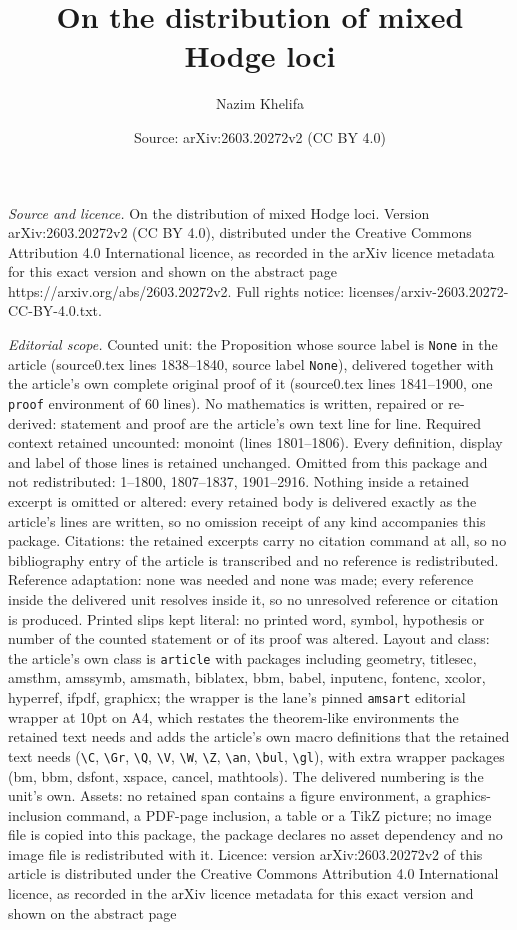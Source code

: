 \documentclass[10pt,a4paper]{amsart}
\title[On the distribution of mixed Hodge loci]{On the distribution of mixed Hodge loci}
\author{Nazim Khelifa}
\date{Source: arXiv:2603.20272v2 (CC BY 4.0)}
\begin{document}
\maketitle

\noindent\emph{Source and licence.} On the distribution of mixed Hodge loci. Version arXiv:2603.20272v2 (CC BY 4.0), distributed under the Creative Commons Attribution 4.0 International licence, as recorded in the arXiv licence metadata for this exact version and shown on the abstract page https://arxiv.org/abs/2603.20272v2. Full rights notice: licenses/arxiv-2603.20272-CC-BY-4.0.txt.\par\smallskip

\noindent\textit{Editorial scope.} Counted unit: the Proposition whose source label is \texttt{None} in the article (source0.tex lines 1838--1840, source label \texttt{None}), delivered together with the article's own complete original proof of it (source0.tex lines 1841--1900, one \texttt{proof} environment of 60 lines). No mathematics is written, repaired or re-derived: statement and proof are the article's own text line for line. Required context retained uncounted: monoint (lines 1801--1806). Every definition, display and label of those lines is retained unchanged. Omitted from this package and not redistributed: 1--1800, 1807--1837, 1901--2916. Nothing inside a retained excerpt is omitted or altered: every retained body is delivered exactly as the article's lines are written, so no omission receipt of any kind accompanies this package. Citations: the retained excerpts carry no citation command at all, so no bibliography entry of the article is transcribed and no reference is redistributed. Reference adaptation: none was needed and none was made; every reference inside the delivered unit resolves inside it, so no unresolved reference or citation is produced. Printed slips kept literal: no printed word, symbol, hypothesis or number of the counted statement or of its proof was altered. Layout and class: the article's own class is \texttt{article} with packages including geometry, titlesec, amsthm, amssymb, amsmath, biblatex, bbm, babel, inputenc, fontenc, xcolor, hyperref, ifpdf, graphicx; the wrapper is the lane's pinned \texttt{amsart} editorial wrapper at 10pt on A4, which restates the theorem-like environments the retained text needs and adds the article's own macro definitions that the retained text needs (\texttt{\textbackslash C}, \texttt{\textbackslash Gr}, \texttt{\textbackslash Q}, \texttt{\textbackslash V}, \texttt{\textbackslash W}, \texttt{\textbackslash Z}, \texttt{\textbackslash an}, \texttt{\textbackslash bul}, \texttt{\textbackslash gl}), with extra wrapper packages (bm, bbm, dsfont, xspace, cancel, mathtools). The delivered numbering is the unit's own. Assets: no retained span contains a figure environment, a graphics-inclusion command, a PDF-page inclusion, a table or a TikZ picture; no image file is copied into this package, the package declares no asset dependency and no image file is redistributed with it. Licence: version arXiv:2603.20272v2 of this article is distributed under the Creative Commons Attribution 4.0 International licence, as recorded in the arXiv licence metadata for this exact version and shown on the abstract page 
\end{document}
